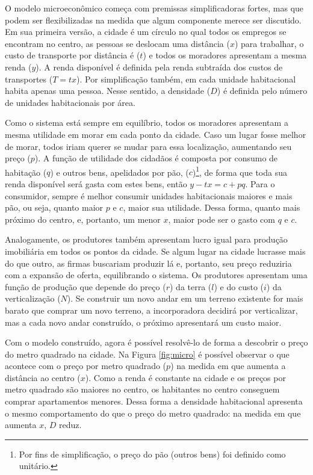 O modelo microeconômico começa com premissas simplificadoras fortes, mas que podem ser flexibilizadas na medida que algum componente merece ser discutido. Em sua primeira versão, a cidade é um círculo no qual todos os empregos se encontram no centro, as pessoas se deslocam uma distância ($x$) para trabalhar, o custo de transporte por distância é ($t$) e todos os moradores apresentam a mesma renda ($y$). A renda disponível é definida pela renda subtraída dos custos de transportes ($T=tx$). Por simplificação também, em cada unidade habitacional habita apenas uma pessoa. Nesse sentido, a densidade ($D$) é definida pelo número de unidades habitacionais por área.

Como o sistema está sempre em equilíbrio, todos os moradores apresentam a mesma utilidade em morar em cada ponto da cidade. Caso um lugar fosse melhor de morar, todos iriam querer se mudar para essa localização, aumentando seu preço ($p$). A função de utilidade dos cidadãos é composta por consumo de habitação ($q$) e outros bens, apelidados por pão, ($c$)\footnote{Por fins de simplificação, o preço do pão (outros bens) foi definido como unitário.}, de forma que toda sua renda disponível será gasta com estes bens, então $y-tx=c+pq$. Para o consumidor, sempre é melhor consumir unidades habitacionais maiores e mais pão, ou seja, quanto maior $p$ e $c$, maior sua utilidade. Dessa forma, quanto mais próximo do centro, e, portanto, um menor $x$, maior pode ser o gasto com $q$ e $c$.

Analogamente, os produtores também apresentam lucro igual para produção imobiliária em todos os pontos da cidade. Se algum lugar na cidade lucrasse mais do que outro, as firmas buscariam produzir lá e, portanto, seu preço reduziria com a expansão de oferta, equilibrando o sistema. Os produtores apresentam uma função de produção que depende do preço ($r$) da terra ($l$) e do custo ($i$) da verticalização ($N$). Se construir um novo andar em um terreno existente for mais barato que comprar um novo terreno, a incorporadora decidirá por verticalizar, mas a cada novo andar construído, o próximo apresentará um custo maior.

Com o modelo construído, agora é possível resolvê-lo de forma a descobrir o preço do metro quadrado na cidade. Na Figura \ref{fig:micro} é possível observar o que acontece com o preço por metro quadrado ($p$) na medida em que aumenta a distância ao centro ($x$). Como a renda é constante na cidade e os preços por metro quadrado são maiores no centro, os habitantes no centro conseguem comprar apartamentos menores. Dessa forma a densidade habitacional apresenta o mesmo comportamento do que o preço do metro quadrado: na medida em que aumenta $x$, $D$ reduz.

